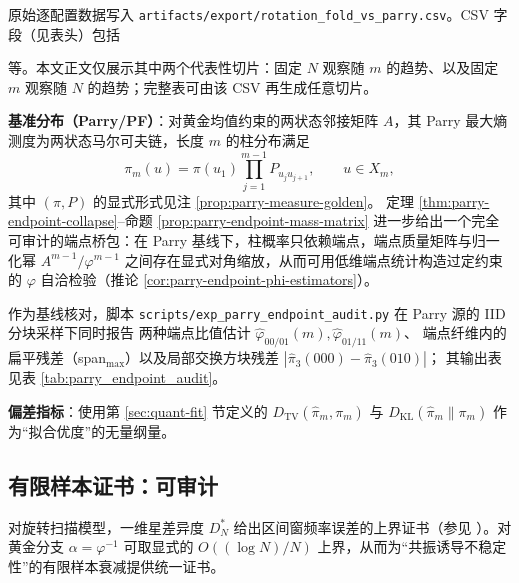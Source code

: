 \begin{remark}[原始数据文件与字段说明]\label{rem:exp-data-files}
\begin{sloppypar}
原始逐配置数据写入 \texttt{artifacts/export/rotation\_fold\_vs\_parry.csv}。CSV 字段（见表头）包括
\begin{center}
\end{center}
等。本文正文仅展示其中两个代表性切片：固定 $N$ 观察随 $m$ 的趋势、以及固定 $m$ 观察随 $N$ 的趋势；完整表可由该 CSV 再生成任意切片。
\end{sloppypar}
\end{remark}

\textbf{基准分布（Parry/PF）}：对黄金均值约束的两状态邻接矩阵 $A$，其 Parry 最大熵测度为两状态马尔可夫链，长度 $m$ 的柱分布满足
\[
\pi_m(u)=\pi(u_1)\prod_{j=1}^{m-1}P_{u_j u_{j+1}},\qquad u\in X_m,
\]
其中 $(\pi,P)$ 的显式形式见注 \ref{prop:parry-measure-golden}。
定理 \ref{thm:parry-endpoint-collapse}--命题 \ref{prop:parry-endpoint-mass-matrix} 进一步给出一个完全可审计的端点桥包：在 Parry 基线下，柱概率只依赖端点，端点质量矩阵与归一化幂 \(A^{m-1}/\varphi^{m-1}\) 之间存在显式对角缩放，从而可用低维端点统计构造过定约束的 \(\varphi\) 自洽检验（推论 \ref{cor:parry-endpoint-phi-estimators}）。

\begin{remark}\label{rem:parry-endpoint-audit}
作为基线核对，脚本 \texttt{scripts/exp\_parry\_endpoint\_audit.py} 在 Parry 源的 IID 分块采样下同时报告
两种端点比值估计 \(\widehat\varphi_{00/01}(m),\widehat\varphi_{01/11}(m)\)、
端点纤维内的扁平残差（span\(_{\max}\)）以及局部交换方块残差 \(|\hat\pi_3(000)-\hat\pi_3(010)|\)；
其输出表见表 \ref{tab:parry_endpoint_audit}。
\end{remark}


\textbf{偏差指标}：使用第 \ref{sec:quant-fit} 节定义的
\(
D_{\mathrm{TV}}(\hat{\pi}_m,\pi_m)
\)
与
\(
D_{\mathrm{KL}}(\hat{\pi}_m\|\pi_m)
\)
作为“拟合优度”的无量纲量。

\subsection{有限样本证书：可审计}

对旋转扫描模型，一维星差异度 $D_N^*$ 给出区间窗频率误差的上界证书（参见 \cite{KuipersNiederreiter1974}）。对黄金分支 $\alpha=\varphi^{-1}$ 可取显式的 $O((\log N)/N)$ 上界，从而为“共振诱导不稳定性”的有限样本衰减提供统一证书。

